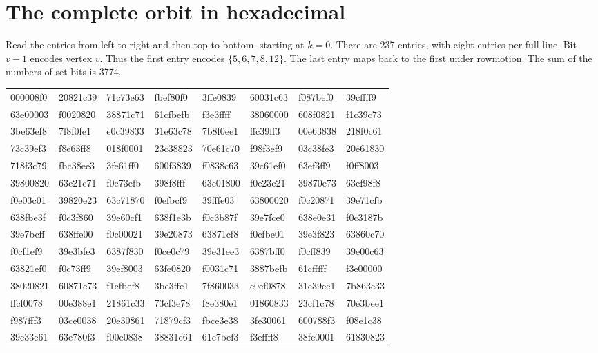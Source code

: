 \documentclass[11pt]{article}
\begin{document}
\section{The complete orbit in hexadecimal}\label{app:certificate}
Read the entries from left to right and then top to bottom, starting at
$k=0$. There are 237 entries, with eight entries per full line. Bit $v-1$
encodes vertex $v$. Thus the first entry encodes $\{5,6,7,8,12\}$.
The last entry maps back to the first under rowmotion. The sum of the
numbers of set bits is 3774.
\begin{center}
\small\ttfamily
\begin{tabular}{@{}llllllll@{}}
000008f0 & 20821c39 & 71c73e63 & fbef80f0 & 3ffe0839 & 60031c63 & f087bef0 & 39cffff9 \\
63e00003 & f0020820 & 38871c71 & 61cfbefb & f3e3ffff & 38060000 & 608f0821 & f1c39c73 \\
3be63ef8 & 7f8f0fe1 & e0c39833 & 31e63c78 & 7b8f0ee1 & ffc39ff3 & 00e63838 & 218f0c61 \\
73c39ef3 & f8e63ff8 & 018f0001 & 23c38823 & 70e61c70 & f98f3ef9 & 03c38fe3 & 20e61830 \\
718f3c79 & fbc38ee3 & 3fe61ff0 & 600f3839 & f0838c63 & 39c61ef0 & 63ef3ff9 & f0ff8003 \\
39800820 & 63c21c71 & f0e73efb & 398f8fff & 63c01800 & f0e23c21 & 39870e73 & 63cf98f8 \\
f0e03c01 & 39820e23 & 63c71870 & f0efbcf9 & 39fffe03 & 63800020 & f0c20871 & 39e71cfb \\
638fbe3f & f0c3f860 & 39e60cf1 & 638f1e3b & f0c3b87f & 39e7fce0 & 638e0e31 & f0c3187b \\
39e7bcff & 638ffe00 & f0c00021 & 39e20873 & 63871cf8 & f0cfbe01 & 39e3f823 & 63860c70 \\
f0cf1ef9 & 39e3bfe3 & 6387f830 & f0ce0c79 & 39e31ee3 & 6387bff0 & f0cff839 & 39e00c63 \\
63821ef0 & f0c73ff9 & 39ef8003 & 63fe0820 & f0031c71 & 3887befb & 61cfffff & f3e00000 \\
38020821 & 60871c73 & f1cfbef8 & 3be3ffe1 & 7f860033 & e0cf0878 & 31e39ce1 & 7b863e33 \\
ffcf0078 & 00e388e1 & 21861c33 & 73cf3e78 & f8e380e1 & 01860833 & 23cf1c78 & 70e3bee1 \\
f987fff3 & 03ce0038 & 20e30861 & 71879cf3 & fbce3e38 & 3fe30061 & 600788f3 & f08e1c38 \\
39c33e61 & 63e780f3 & f00e0838 & 38831c61 & 61c7bef3 & f3effff8 & 38fe0001 & 61830823 \\

\end{tabular}
\end{center}
\end{document}
